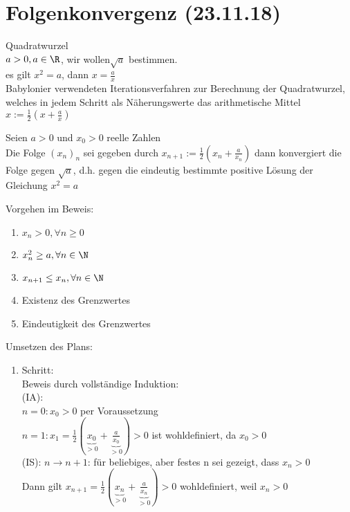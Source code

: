 \documentclass[12pt,a4paper,titlepage,draft]{article}
\begin{document}
	\section{Folgenkonvergenz (23.11.18)}
	\begin{bsp}
		Quadratwurzel\\
		\(a > 0, a \in \R\), wir wollen\(\sqrt{a}\) bestimmen.\\
		es gilt \(x^2 = a\), dann \(x = \frac{a}{x}\)\vspace{5mm}\\
		Babylonier verwendeten Iterationsverfahren zur Berechnung der Quadratwurzel, welches in jedem Schritt als Näherungswerte das arithmetische Mittel\vspace{5mm}\\
		\(x := \frac{1}{2}(x+\frac{a}{x})\)
		\begin{beh}
			Seien \(a > 0\) und \(x_0 > 0\) reelle Zahlen\\
			Die Folge \((x_n)_n\) sei gegeben durch \(x_{n+1} := \frac{1}{2}(x_n + \frac{a}{x_n})\) dann konvergiert die Folge gegen \(\sqrt{a}\), d.h. gegen die eindeutig bestimmte positive Lösung der Gleichung \(x^2 = a\)
		\end{beh}		
		Vorgehen im Beweis:
		\begin{enumerate}
			\item \(x_n > 0, \forall n \geq 0\)
			\item \(x_n^2 \geq a, \forall n \in \N\)
			\item \(x_{n+1} \leq x_n, \forall n \in \N\)
			\item Existenz des Grenzwertes
			\item Eindeutigkeit des Grenzwertes
		\end{enumerate}
		\begin{bew}
			Umsetzen des Plans:\\
			\begin{enumerate}				
				\item Schritt:\\
					Beweis durch vollständige Induktion:\\
					(IA):\\
					\(n=0: x_0 > 0\) per Voraussetzung\\
					\(n=1: x_1 = \frac{1}{2}(\underbrace{x_0}_{>0} + \underbrace{\frac{a}{x_0}}_{>0}) > 0\) ist wohldefiniert, da \(x_0 > 0\)\\
					(IS): \(n \rightarrow n+1\): für beliebiges, aber festes n sei gezeigt, dass \(x_n > 0\)\\
					Dann gilt \(x_{n+1} = \frac{1}{2}(\underbrace{x_n}_{>0} + \underbrace{\frac{a}{x_n}}_{>0}) > 0\) wohldefiniert, weil \(x_n > 0\)\\

\end{enumerate}
\end{bew}
\end{bsp}
\end{document}

